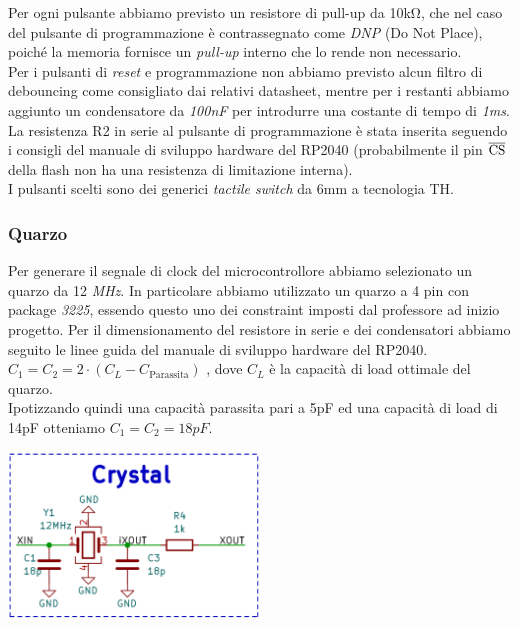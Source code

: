\noindent Per ogni pulsante abbiamo previsto un resistore di pull-up da 10kΩ, che
nel caso del pulsante di programmazione è contrassegnato come \emph{DNP}
(Do Not Place), poiché la memoria fornisce un \emph{pull-up} interno che
lo rende non necessario.\\
Per i pulsanti di \emph{reset} e programmazione non abbiamo previsto
alcun filtro di debouncing come consigliato dai relativi datasheet,
mentre per i restanti abbiamo aggiunto un condensatore da \emph{100nF}
per introdurre una costante di tempo di \emph{1ms}.\\
La resistenza R2 in serie al pulsante di programmazione è stata inserita
seguendo i consigli del manuale di sviluppo hardware del RP2040
(probabilmente il pin $\overline{\rm {CS}}$ della flash non ha una
resistenza di limitazione interna).\\
I pulsanti scelti sono dei generici \emph{tactile switch} da 6mm a
tecnologia TH.

\hypertarget{quarzo}{%
\subsubsection{Quarzo}\label{quarzo}}

Per generare il segnale di clock del microcontrollore abbiamo
selezionato un quarzo da 12 \emph{MHz}. In particolare abbiamo
utilizzato un quarzo a 4 pin con package \emph{3225}, essendo questo uno
dei constraint imposti dal professore ad inizio progetto. Per il
dimensionamento del resistore in serie e dei condensatori abbiamo
seguito le linee guida del manuale di sviluppo hardware del RP2040.\\
\(C_{1} = C_{2} = 2 \cdot (C_{L} - C_{\text{Parassita}})\)
, dove \(C_{L}\) è la capacità di load ottimale del quarzo.\\
Ipotizzando quindi una capacità parassita pari a 5pF ed una capacità di
load di 14pF otteniamo \(C_{1} = C_{2} =18pF\).

\begin{center}
\includegraphics[width=0.5\textwidth]{figures/image76.png}
\captionsetup{type=figure}
\end{center}

